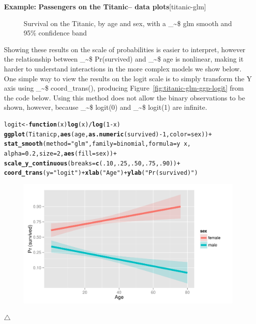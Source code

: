 \documentclass{article}
\makeatletter
\newcommand{\hlnum}[1]{\textcolor[rgb]{0.686,0.059,0.569}{#1}}%
\newcommand{\hlstr}[1]{\textcolor[rgb]{0.192,0.494,0.8}{#1}}%
\newcommand{\hlopt}[1]{\textcolor[rgb]{0,0,0}{#1}}%
\newcommand{\hlstd}[1]{\textcolor[rgb]{0.345,0.345,0.345}{#1}}%
\newcommand{\hlkwa}[1]{\textcolor[rgb]{0.161,0.373,0.58}{\textbf{#1}}}%
\newcommand{\hlkwb}[1]{\textcolor[rgb]{0.69,0.353,0.396}{#1}}%
\newcommand{\hlkwc}[1]{\textcolor[rgb]{0.333,0.667,0.333}{#1}}%
\newcommand{\hlkwd}[1]{\textcolor[rgb]{0.737,0.353,0.396}{\textbf{#1}}}%
\newenvironment{kframe}{%
 \def\at@end@of@kframe{}%
 \ifinner\ifhmode%
  \def\at@end@of@kframe{\end{minipage}}%
  \begin{minipage}{\columnwidth}%
 \fi\fi%
 \def\FrameCommand##1{\hskip\@totalleftmargin \hskip-\fboxsep
 \colorbox{shadecolor}{##1}\hskip-\fboxsep
     \hskip-\linewidth \hskip-\@totalleftmargin \hskip\columnwidth}%
 \MakeFramed {\advance\hsize-\width
   \@totalleftmargin\z@ \linewidth\hsize
   \@setminipage}}%
 {\par\unskip\endMakeFramed%
 \at@end@of@kframe}
\newenvironment{knitrout}{}{} %
\newcommand{\figref}[1]{Figure~\ref{#1}}
\newcommand\code{\bgroup\@makeother\_\@makeother\~\@makeother\$\@codex}
\def\@codex#1{{\normalfont\ttfamily\hyphenchar\font=-1 #1}\egroup}
\newcommand{\func}[1]{\code{#1()}}
\newenvironment{Example}[2][unnamed-example]%
  {\medskip\noindent\textbf{\textsf{Example:}}
   \textbf{#2}\hfill [#1]\par\smallskip
  }
  {\hfill $\triangle$}
\makeatother
\begin{document}
\begin{Example}[titanic-glm]{Passengers on the Titanic-- data plots}
\begin{knitrout}
\begin{figure}[hb]
{}

\caption[Survival on the Titanic, by age and sex, with a \code{glm} smooth and 95\% confidence band]{Survival on the Titanic, by age and sex, with a \code{glm} smooth and 95\% confidence band}\label{fig:titanic-glm-ggp2}
\end{figure}


\end{knitrout}

Showing these results on the scale of probabilities is easier to interpret,
however the relationship between \code{Pr(survived)} and \code{age}
is nonlinear, making it harder to understand interactions in the
more complex models we show below.  One simple way to view the results
on the logit scale is to simply transform the Y axis using
\func{coord\_trans}, producing \figref{fig:titanic-glm-ggp-logit} from
the code below.
Using this method does not allow the binary observations
to be shown, however, because \code{logit(0)} and \code{logit(1)} are infinite.
\begin{knitrout}
\color{fgcolor}\begin{kframe}
\begin{alltt}
\hlstd{logit} \hlkwb{<-} \hlkwa{function}\hlstd{(}\hlkwc{x}\hlstd{)} \hlkwd{log}\hlstd{(x)}\hlopt{/}\hlkwd{log}\hlstd{(}\hlnum{1}\hlopt{-}\hlstd{x)}
\hlkwd{ggplot}\hlstd{(Titanicp,} \hlkwd{aes}\hlstd{(age,} \hlkwd{as.numeric}\hlstd{(survived)}\hlopt{-}\hlnum{1}\hlstd{,} \hlkwc{color}\hlstd{=sex))} \hlopt{+}
  \hlkwd{stat_smooth}\hlstd{(}\hlkwc{method}\hlstd{=}\hlstr{"glm"}\hlstd{,} \hlkwc{family}\hlstd{=binomial,} \hlkwc{formula}\hlstd{=y}\hlopt{~}\hlstd{x,}
              \hlkwc{alpha}\hlstd{=}\hlnum{0.2}\hlstd{,} \hlkwc{size}\hlstd{=}\hlnum{2}\hlstd{,} \hlkwd{aes}\hlstd{(}\hlkwc{fill}\hlstd{=sex))} \hlopt{+}
  \hlkwd{scale_y_continuous}\hlstd{(}\hlkwc{breaks}\hlstd{=}\hlkwd{c}\hlstd{(}\hlnum{.10}\hlstd{,} \hlnum{.25}\hlstd{,} \hlnum{.50}\hlstd{,} \hlnum{.75}\hlstd{,} \hlnum{.90}\hlstd{))} \hlopt{+}
  \hlkwd{coord_trans}\hlstd{(}\hlkwc{y}\hlstd{=}\hlstr{"logit"}\hlstd{)} \hlopt{+} \hlkwd{xlab}\hlstd{(}\hlstr{"Age"}\hlstd{)} \hlopt{+} \hlkwd{ylab}\hlstd{(}\hlstr{"Pr (survived)"}\hlstd{)}
\end{alltt}
\end{kframe}\begin{figure}[hb]

{\centering \includegraphics[width=.6\linewidth]{figure/titanic-glm-ggp-logit-1} 

}
\end{figure}
\end{knitrout}
\end{Example}
\end{document}
